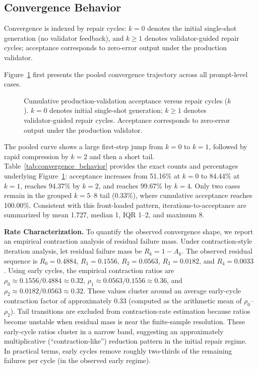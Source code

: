 \subsection{Convergence Behavior}
Convergence is indexed by repair cycles: $k=0$ denotes the initial single-shot generation (no validator feedback), and $k\geq 1$ denotes validator-guided repair cycles; acceptance corresponds to zero-error output under the production validator.

Figure~\ref{fig:cumulative_convergence} first presents the pooled convergence trajectory across all prompt-level cases.

\begin{figure}[H]
\centering

\caption{Cumulative production-validation acceptance versus repair cycles ($k$). $k=0$ denotes initial single-shot generation; $k\geq 1$ denotes validator-guided repair cycles. Acceptance corresponds to zero-error output under the production validator.}
\label{fig:cumulative_convergence}
\end{figure}

The pooled curve shows a large first-step jump from $k=0$ to $k=1$, followed by rapid compression by $k=2$ and then a short tail. Table~\ref{tab:convergence_behavior} provides the exact counts and percentages underlying Figure~\ref{fig:cumulative_convergence}: acceptance increases from 51.16\% at $k=0$ to 84.44\% at $k=1$, reaches 94.37\% by $k=2$, and reaches 99.67\% by $k=4$. Only two cases remain in the grouped $k=5$--$8$ tail (0.33\%), where cumulative acceptance reaches 100.00\%. Consistent with this front-loaded pattern, iterations-to-acceptance are summarized by mean 1.727, median 1, IQR 1--2, and maximum 8.



\noindent\textbf{Rate Characterization.} To quantify the observed convergence shape, we report an empirical contraction analysis of residual failure mass. Under contraction-style iteration analysis, let residual failure mass be $R_k = 1 - A_k$. The observed residual sequence is $R_0=0.4884$, $R_1=0.1556$, $R_2=0.0563$, $R_3=0.0182$, and $R_4=0.0033$. Using early cycles, the empirical contraction ratios are $\rho_0 \approx 0.1556/0.4884 \approx 0.32$, $\rho_1 \approx 0.0563/0.1556 \approx 0.36$, and $\rho_2 \approx 0.0182/0.0563 \approx 0.32$. These values cluster around an average early-cycle contraction factor of approximately 0.33 (computed as the arithmetic mean of $\rho_0$--$\rho_2$). Tail transitions are excluded from contraction-rate estimation because ratios become unstable when residual mass is near the finite-sample resolution. These early-cycle ratios cluster in a narrow band, suggesting an approximately multiplicative (``contraction-like'') reduction pattern in the initial repair regime. In practical terms, early cycles remove roughly two-thirds of the remaining failures per cycle (in the observed early regime).

